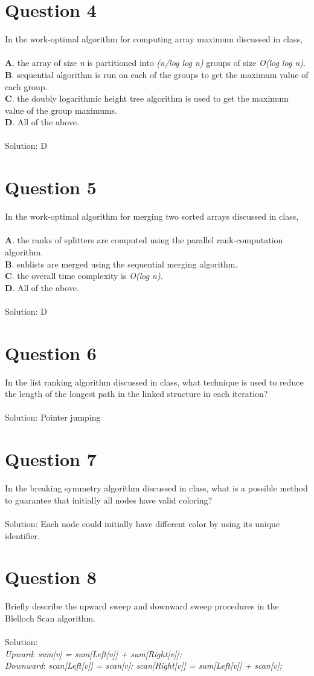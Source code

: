 \documentclass[twoside]{article}
\begin{document}
\section*{Question 4}
In the work-optimal algorithm for computing array maximum discussed in class, \\ \\
\textbf{A}. the array of size {\em n} is partitioned into {\em (n/log log n)} groups of size {\em O(log log n)}. \\
\textbf{B}. sequential algorithm is run on each of the groups to get the maximum value of each group. \\
\textbf{C}. the doubly logarithmic height tree algorithm is used to get the maximum value of the group maximums. \\
\textbf{D}. All of the above. \\ \\ 
Solution: D

\section*{Question 5}
In the work-optimal algorithm for merging two sorted arrays discussed in class, \\ \\ 
\textbf{A}. the ranks of splitters are computed using the parallel rank-computation algorithm. \\
\textbf{B}. sublists are merged using the sequential merging algorithm. \\
\textbf{C}. the overall time complexity is {\em O(log n)}. \\
\textbf{D}. All of the above. \\ \\ 
Solution: D

\section*{Question 6}
In the list ranking algorithm discussed in class, what technique is used to reduce the length of the longest path in the linked structure in each iteration? \\ \\ 
Solution: Pointer jumping

\section*{Question 7}
In the breaking symmetry algorithm discussed in class, what is a possible method to guarantee that initially all nodes have valid coloring? \\ \\
Solution: Each node could initially have different color by using its unique identifier. 

\section*{Question 8}
Briefly describe the upward sweep and downward sweep procedures in the Blelloch Scan algorithm. \\ \\ 
Solution: \\
\textit{Upward}: 
{\em sum[v] = sum[Left[v]] + sum[Right[v]]; } \\
\textit{Downward}:  
{\em scan[Left[v]] = scan[v]; scan[Right[v]] = sum[Left[v]] + scan[v]; }
\end{document}

